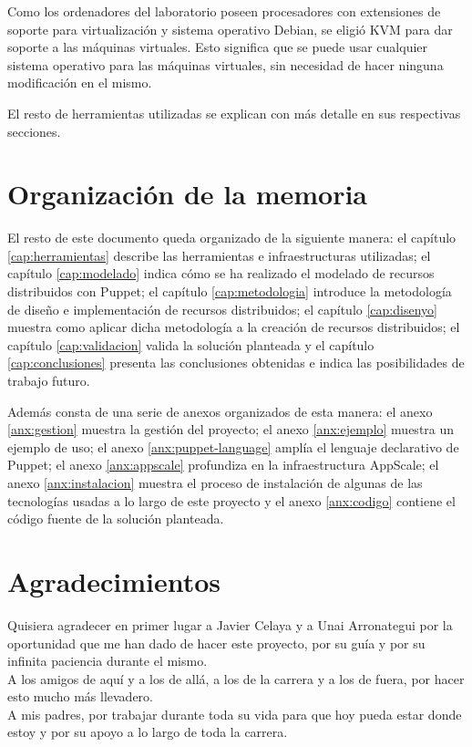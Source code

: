 Como los ordenadores del laboratorio poseen procesadores con extensiones de soporte para virtualización y sistema operativo Debian, se eligió KVM para dar soporte a las máquinas virtuales. Esto significa que se puede usar cualquier sistema operativo para las máquinas virtuales, sin necesidad de hacer ninguna modificación en el mismo.

El resto de herramientas utilizadas se explican con más detalle en sus respectivas secciones.


\section{Organización de la memoria}


El resto de este documento queda organizado de la siguiente manera: el capítulo \ref{cap:herramientas} describe las herramientas e infraestructuras utilizadas; el capítulo \ref{cap:modelado} indica cómo se ha realizado el modelado de recursos distribuidos con Puppet; el capítulo \ref{cap:metodologia} introduce la metodología de diseño e implementación de recursos distribuidos; el capítulo \ref{cap:disenyo} muestra como aplicar dicha metodología a la creación de recursos distribuidos; el capítulo \ref{cap:validacion} valida la solución planteada y el capítulo \ref{cap:conclusiones} presenta las conclusiones obtenidas e indica las posibilidades de trabajo futuro.

Además consta de una serie de anexos organizados de esta manera: el anexo \ref{anx:gestion} muestra la gestión del proyecto; el anexo \ref{anx:ejemplo} muestra un ejemplo de uso; el anexo \ref{anx:puppet-language} amplía el lenguaje declarativo de Puppet; el anexo \ref{anx:appscale} profundiza en la infraestructura AppScale; el anexo \ref{anx:instalacion} muestra el proceso de instalación de algunas de las tecnologías usadas a lo largo de este proyecto y el anexo \ref{anx:codigo} contiene el código fuente de la solución planteada.


\section{Agradecimientos}


Quisiera agradecer en primer lugar a Javier Celaya y a Unai Arronategui por la oportunidad que me han dado de hacer este proyecto, por su guía y por su infinita paciencia durante el mismo. \\

A los amigos de aquí y a los de allá, a los de la carrera y a los de fuera, por hacer esto mucho más llevadero. \\

A mis padres, por trabajar durante toda su vida para que hoy pueda estar donde estoy y por su apoyo a lo largo de toda la carrera. \\

